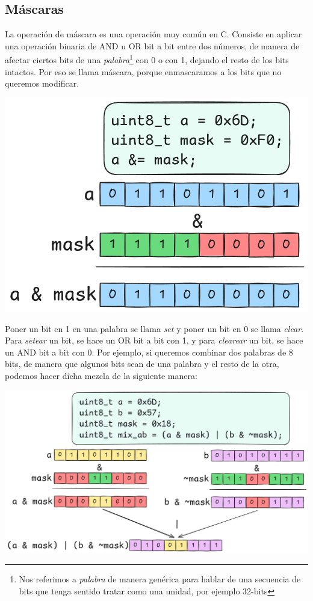 \documentclass[]{scrartcl}
\begin{document}
\subsection*{Máscaras}

La operación de máscara es una operación muy común en C. Consiste en aplicar una operación binaria de AND u OR bit a bit entre dos números, de manera de afectar ciertos bits de una \textit{palabra}\footnote{Nos referimos a \textit{palabra} de manera genérica para hablar de una secuencia de bits que tenga sentido tratar como una unidad, por ejemplo 32-bits} con 0 o con 1, dejando el resto de los bits intactos. Por eso se llama máscara, porque enmascaramos a los bits que no queremos modificar.

\begin{center}
  \includegraphics[scale=0.3]{./img/mask.png}
  \label{fig:masking}
\end{center}

Poner un bit en 1 en una palabra se llama \textit{set} y poner un bit en 0 se llama \textit{clear}. Para \textit{setear} un bit, se hace un OR bit a bit con 1, y para \textit{clearear} un bit, se hace un AND bit a bit con 0.
Por ejemplo, si queremos combinar dos palabras de 8 bits, de manera que algunos bits sean de una palabra y el resto de la otra, podemos hacer dicha mezcla de la siguiente manera:

\begin{center}
  \includegraphics[scale=0.2]{./img/mask_multiple.png}
  \label{fig:masking_mix}
\end{center}
\end{document}
